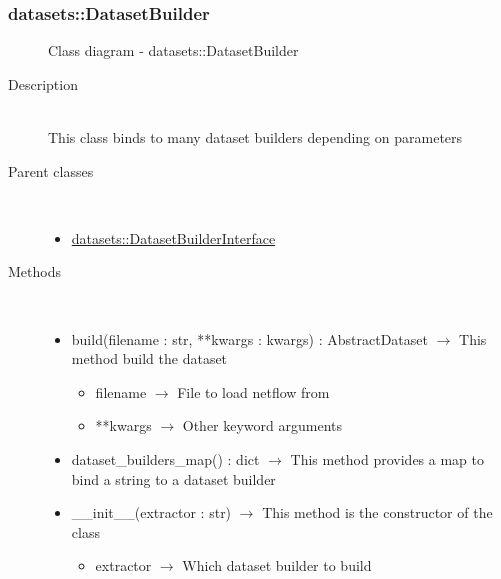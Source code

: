\subsubsection[DatasetBuilder]{datasets::DatasetBuilder}
\begin{figure}[h]
\centering
{}
\caption{Class diagram - datasets::DatasetBuilder}
\end{figure}\begin{description}
\item[Description] \hfill \\
 This class binds to many dataset builders depending on parameters
\item[Parent classes] \hfill \\
 \vspace{-1cm}
\begin{itemize}
\item \hyperlink{datasets::DatasetBuilderInterface}{datasets::DatasetBuilderInterface}
\end{itemize}

\item[Methods] \hfill \\
 \vspace{-1cm}
\begin{itemize}
\item build(filename : str, **kwargs : kwargs) : AbstractDataset $\rightarrow$ This method build the dataset\begin{itemize}
\item filename $\rightarrow$ File to load netflow from
\item **kwargs $\rightarrow$ Other keyword arguments
\end{itemize}

\item dataset\_builders\_map() : dict $\rightarrow$ This method provides a map to bind a string to a dataset builder
\item \_\_init\_\_(extractor : str) $\rightarrow$ This method is the constructor of the class\begin{itemize}
\item extractor $\rightarrow$ Which dataset builder to build
\end{itemize}

\end{itemize}

\end{description}
